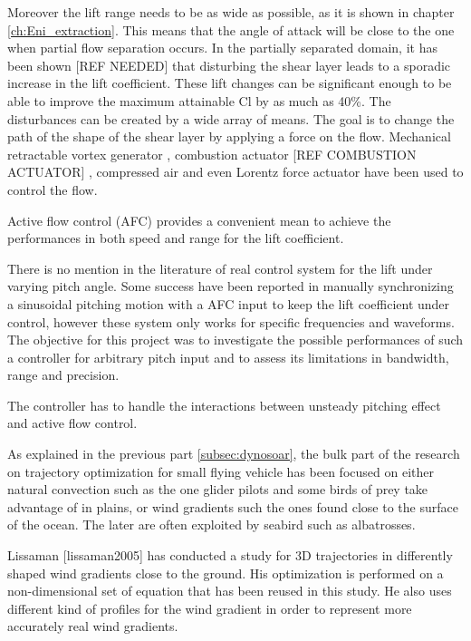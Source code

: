 \par Moreover the lift range needs to be as wide as possible, as it is shown in chapter \ref{ch:Eni_extraction}.
This means that the angle of attack will be close to the one when partial flow separation occurs.
In the partially separated domain, it has been shown [REF NEEDED] that disturbing the shear layer leads to a sporadic increase in the lift coefficient.
These lift changes can be significant enough to be able to improve the maximum attainable Cl by as much as 40\%.
The disturbances can be created by a wide array of means. 
The goal is to change the path of the shape of the shear layer by applying a force on the flow. 
Mechanical retractable vortex generator \cite{Onera_afc}, combustion actuator [REF COMBUSTION ACTUATOR] , compressed air \cite{Williams_afc} and even Lorentz force actuator \cite{Dresden_afc} have been used to control the flow.

\par Active flow control (AFC) provides a convenient mean to achieve the performances in both speed and range for the lift coefficient. 

\par There is no mention in the literature of real control system for the lift under varying pitch angle.
Some success have been reported in manually synchronizing a sinusoidal pitching motion with a AFC input to keep the lift coefficient under control, however these system only works for specific frequencies and waveforms. 
The objective for this project was to investigate the possible performances of such a controller for arbitrary pitch input and to assess its limitations in bandwidth, range and precision.

\par The controller has to handle the interactions between unsteady pitching effect and active flow control.



\par As explained in the previous part \ref{subsec:dynosoar}, the bulk part of the research on trajectory optimization for small flying vehicle has been focused on either natural convection such as the one glider pilots and some birds of prey take advantage of in plains, or wind gradients such the ones found close to the surface of the ocean.
The later are often exploited by seabird such as albatrosses.

Lissaman [lissaman2005] has conducted a study for 3D trajectories in differently shaped wind gradients close to the ground.
His optimization is performed on a non-dimensional set of equation that has been reused in this study.
He also uses different kind of profiles for the wind gradient in order to represent more accurately real wind gradients.


